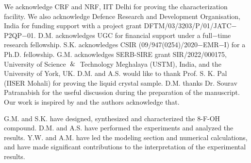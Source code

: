 \documentclass[reprint,amsfonts,amsmath,amssymb,aps,pre,floatfix,10pt]{revtex4-1}
\begin{document}
\begin{acknowledgements}
We acknowledge CRF and NRF, IIT Delhi for proving the characterization facility. We also acknowledge Defence Research and Development Organisation, India for funding support with a project grant DFTM/03/3203/P/01/JATC$-$P2QP$-$01.   D.M. acknowledges UGC for financial support under a full$-$time research fellowship. S.K. acknowledges CSIR (09/947(0254)/2020$-$EMR$-$I) for a Ph.D. fellowship. G.M. acknowledges SERB-SIRE grant SIR/2022/000175, University of Science $\And$ Technology Meghalaya (USTM), India, and the University of York, UK. D.M. and A.S. would like to thank Prof. S. K. Pal (IISER Mohali) for proving the liquid crystal sample. D.M. thanks Dr. Sourav Patranabish for the useful discussion during the preparation of the manuscript. Our work is inspired by \cite{patranabish2021quantum_38} and the authors acknowledge that.


G.M. and S.K. have designed, synthesized and characterized the 8-F-OH compound. D.M. and A.S. have performed the experiments and analyzed the results. Y.W. and A.M. have led the modeling section and numerical calculations, and have made significant contributions to the interpretation of the experimental results.

\end{acknowledgements}



\end{document}
